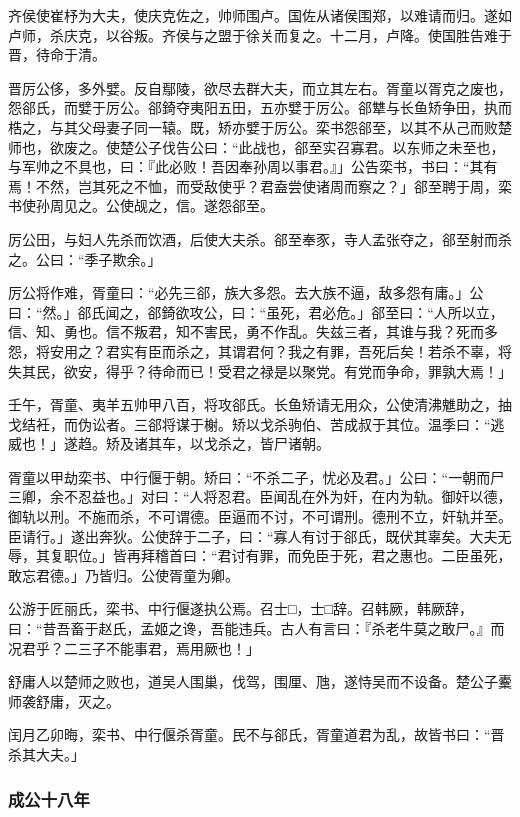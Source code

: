 \documentclass[]{article}
\begin{document}
齐侯使崔杼为大夫，使庆克佐之，帅师围卢。国佐从诸侯围郑，以难请而归。遂如卢师，杀庆克，以谷叛。齐侯与之盟于徐关而复之。十二月，卢降。使国胜告难于晋，待命于清。

晋厉公侈，多外嬖。反自鄢陵，欲尽去群大夫，而立其左右。胥童以胥克之废也，怨郤氏，而嬖于厉公。郤錡夺夷阳五田，五亦嬖于厉公。郤犨与长鱼矫争田，执而梏之，与其父母妻子同一辕。既，矫亦嬖于厉公。栾书怨郤至，以其不从己而败楚师也，欲废之。使楚公子伐告公曰：``此战也，郤至实召寡君。以东师之未至也，与军帅之不具也，曰：『此必败！吾因奉孙周以事君。』」公告栾书，书曰：``其有焉！不然，岂其死之不恤，而受敌使乎？君盍尝使诸周而察之？」郤至聘于周，栾书使孙周见之。公使觇之，信。遂怨郤至。

厉公田，与妇人先杀而饮酒，后使大夫杀。郤至奉豕，寺人孟张夺之，郤至射而杀之。公曰：``季子欺余。」

厉公将作难，胥童曰：``必先三郤，族大多怨。去大族不逼，敌多怨有庸。」公曰：``然。」郤氏闻之，郤錡欲攻公，曰：``虽死，君必危。」郤至曰：``人所以立，信、知、勇也。信不叛君，知不害民，勇不作乱。失兹三者，其谁与我？死而多怨，将安用之？君实有臣而杀之，其谓君何？我之有罪，吾死后矣！若杀不辜，将失其民，欲安，得乎？待命而已！受君之禄是以聚党。有党而争命，罪孰大焉！」

壬午，胥童、夷羊五帅甲八百，将攻郤氏。长鱼矫请无用众，公使清沸魋助之，抽戈结衽，而伪讼者。三郤将谋于榭。矫以戈杀驹伯、苦成叔于其位。温季曰：``逃威也！」遂趋。矫及诸其车，以戈杀之，皆尸诸朝。

胥童以甲劫栾书、中行偃于朝。矫曰：``不杀二子，忧必及君。」公曰：``一朝而尸三卿，余不忍益也。」对曰：``人将忍君。臣闻乱在外为奸，在内为轨。御奸以德，御轨以刑。不施而杀，不可谓德。臣逼而不讨，不可谓刑。德刑不立，奸轨并至。臣请行。」遂出奔狄。公使辞于二子，曰：``寡人有讨于郤氏，既伏其辜矣。大夫无辱，其复职位。」皆再拜稽首曰：``君讨有罪，而免臣于死，君之惠也。二臣虽死，敢忘君德。」乃皆归。公使胥童为卿。

公游于匠丽氏，栾书、中行偃遂执公焉。召士□，士□辞。召韩厥，韩厥辞，曰：``昔吾畜于赵氏，孟姬之谗，吾能违兵。古人有言曰：『杀老牛莫之敢尸。』而况君乎？二三子不能事君，焉用厥也！」

舒庸人以楚师之败也，道吴人围巢，伐驾，围厘、虺，遂恃吴而不设备。楚公子櫜师袭舒庸，灭之。

闰月乙卯晦，栾书、中行偃杀胥童。民不与郤氏，胥童道君为乱，故皆书曰：``晋杀其大夫。」

\hypertarget{header-n1785}{%
\subsubsection{成公十八年}\label{header-n1785}}
\end{document}
